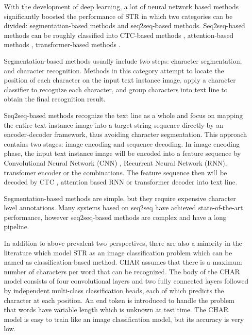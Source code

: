 \documentclass[final]{cvpr}
\begin{document}
With the development of deep learning, a lot of neural network based methods significantly boosted the performance of STR in which two categories can be divided: segmentation-based methods \cite{liao2019scene} and seq2seq-based methods.
Seq2seq-based methods can be roughly classified into CTC-based \cite{graves2006connectionist} methods \cite{shi2016end, borisyuk2018rosetta, du2020pp}, attention-based \cite{bahdanau2014neural} methods \cite{shi2016robust, shi2018aster, li2019show, zhan2019esir}, transformer-based \cite{vaswani2017attention} methods \cite{sheng2019nrtr, yang2019simple, lu2019master, lee2020recognizing, bartz2019kiss, yu2020towards}.

Segmentation-based \cite{liao2019scene} methods usually include two steps: character segmentation,
and character recognition. Methods in this category attempt to locate the position of each character on the input text instance image, apply a character classifier to recognize each character, and group characters into text line to obtain the final recognition result.

Seq2seq-based methods recognize the text line as a whole and focus on mapping the entire text instance image into a target string sequence directly by an encoder-decoder framework, thus avoiding character segmentation. This approach contains two stages: image encoding and sequence decoding. In image encoding phase, the input text instance image will be encoded into a feature sequence by Convolutional Neural Network (CNN) \cite{lecun1998gradient}, Recurrent Neural Network (RNN), transfomer \cite{vaswani2017attention} encoder or the combinations. The feature sequence then will be decoded by CTC \cite{graves2006connectionist}, attention based RNN or transformer \cite{vaswani2017attention} decoder into text line.

Segmentation-based methods \cite{liao2019scene} are simple, but they require expensive character level annotations. Many systems based on seq2seq have achieved state-of-the-art performance, however seq2seq-based methods are complex and have a long pipeline.

In addition to above prevalent two perspectives, there are also a minority in the literature which model STR as an image classification problem which can be named as classification-based method. CHAR \cite{jaderberg14c} assumes that there is a maximum number  of characters per word  that can be recognized.
The body of the CHAR model consists of four convolutional layers and two fully connected layers followed by  independent multi-class classification heads, each of which predicts the character at each position. An end token  is introduced  to handle the problem that words have variable length which is unknown at test time.
The CHAR model is easy to train like an image classification model, but its accuracy is very low.
\end{document}
